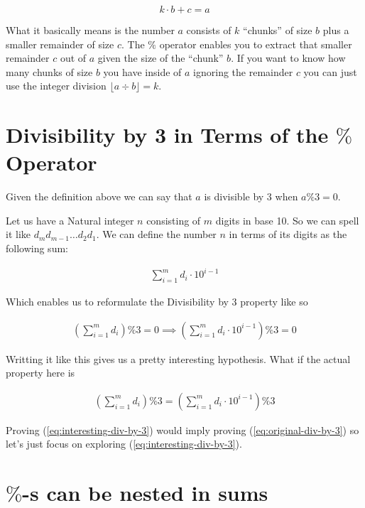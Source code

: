 \documentclass{article}
\begin{document}
\begin{equation} \label{eq:mod-def}
  k \cdot b + c = a
\end{equation}

What it basically means is the number $a$ consists
of $k$ ``chunks'' of size $b$ plus a smaller remainder of size
$c$. The $\%$ operator enables you to extract that smaller remainder
$c$ out of $a$ given the size of the ``chunk'' $b$. If you want to
know how many chunks of size $b$ you have inside of $a$ ignoring the
remainder $c$ you can just use the integer division $\lfloor a \div b
\rfloor = k$.


\section{Divisibility by 3 in Terms of the $\%$ Operator}

Given the definition above we can say that $a$ is divisible by $3$
when $a\%3 = 0$.

Let us have a Natural integer $n$ consisting of $m$ digits in base
10. So we can spell it like $d_md_{m-1}\dots d_{2}d_{1}$. We can
define the number $n$ in terms of its digits as the following sum:

\begin{align*}
  \sum_{i=1}^{m}d_i\cdot 10^{i-1}
\end{align*}

Which enables us to reformulate the Divisibility by 3 property like so

\begin{align} \label{eq:original-div-by-3}
  \left(\sum_{i=1}^{m}d_i\right)\%3 = 0 \implies \left(\sum_{i=1}^{m}d_i\cdot 10^{i-1}\right)\%3 = 0
\end{align}

Writting it like this gives us a pretty interesting hypothesis. What
if the actual property here is

\begin{align} \label{eq:interesting-div-by-3}
  \left(\sum_{i=1}^{m}d_i\right)\%3 = \left(\sum_{i=1}^{m}d_i\cdot 10^{i-1}\right)\%3
\end{align}

Proving (\ref{eq:interesting-div-by-3}) would imply proving (\ref{eq:original-div-by-3}) so let's just focus on exploring (\ref{eq:interesting-div-by-3}).

\section{$\%$-s can be nested in sums}
\end{document}
